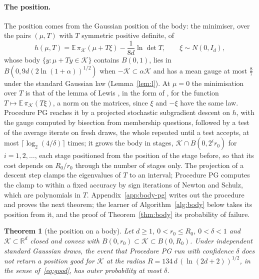 \documentclass[11pt]{amsart}
\newtheorem{theorem}{Theorem}[section]
\theoremstyle{definition}
\numberwithin{equation}{section}
\newcommand{\R}{\mathbb{R}}
\newcommand{\E}{\mathbb{E}}
\newcommand{\cK}{\mathcal{K}}
\begin{document}
\paragraph{The position.} The position comes from the Gaussian position of the body: the minimiser, over the pairs $(\mu,T)$ with $T$ symmetric positive definite, of
\[
h(\mu,T)=\E\,\pi_\cK(\mu+T\xi)-\frac1{8d}\ln\det T,\qquad \xi\sim N(0,I_d),
\]
whose body $\{y:\mu+Ty\in\cK\}$ contains $B(0,1)$, lies in $B(0,9d(2\ln(1+\alpha))^{1/2})$ when $-\cK\subset\alpha\cK$ and has a mean gauge at most $\frac87$ under the standard Gaussian law (Lemma~\ref{lem:l}). At $\mu=0$ the minimisation over $T$ is that of the lemma of Lewis \cite{Lew79}, in the form of \cite[Lemma~6.4.2]{AGM15}, for the function $T\mapsto\E\,\pi_\cK(T\xi)$, a norm on the matrices, since $\xi$ and $-\xi$ have the same law. Procedure PG reaches it by a projected stochastic subgradient descent on $h$, with the gauge computed by bisection from membership questions, followed by a test of the average iterate on fresh draws, the whole repeated until a test accepts, at most $\lceil\log_2(4/\delta)\rceil$ times; it grows the body in stages, $\cK\cap B(0,2^ir_0)$ for $i=1,2,\dots$, each stage positioned from the position of the stage before, so that its cost depends on $R_0/r_0$ through the number of stages only. The projection of a descent step clamps the eigenvalues of $T$ to an interval; Procedure PG computes the clamp to within a fixed accuracy by sign iterations of Newton and Schulz, which are polynomials in $T$. Appendix~\ref{app:body-pg} writes out the procedure and proves the next theorem; the learner of Algorithm~\ref{alg:body} below takes its position from it, and the proof of Theorem~\ref{thm:body} its probability of failure.

\begin{theorem}[the position on a body]\label{thm:pg}
Let $d\ge1$, $0<r_0\le R_0$, $0<\delta<1$ and $\cK\subset\R^d$ closed and convex with $B(0,r_0)\subset\cK\subset B(0,R_0)$. Under independent standard Gaussian draws, the event that Procedure PG run with confidence $\delta$ does not return a position good for $\cK$ at the radius $R=134\,d\,(\ln(2d+2))^{1/2}$, in the sense of~\eqref{eq:good}, has outer probability at most $\delta$.
\end{theorem}
\end{document}
